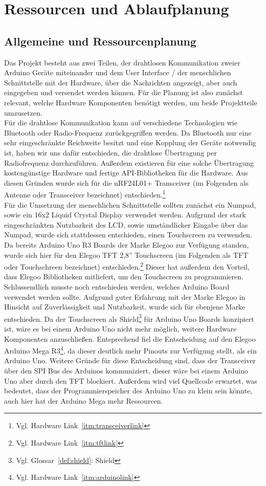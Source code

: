 \documentclass[a4paper, 11pt]{scrartcl}
\begin{document}
\section{Ressourcen und Ablaufplanung}
\subsection{Allgemeine und Ressourcenplanung}\label{ch:planning}
Das Projekt besteht aus zwei Teilen, der drahtlosen Kommunikation zweier Arduino Geräte miteinander und dem User Interface / der menschlichen Schnittstelle mit der
Hardware, über die Nachrichten angezeigt, aber auch eingegeben und versendet werden können. Für die Planung ist also zunächst relevant, welche Hardware Komponenten benötigt werden, 
um beide Projektteile umzusetzen.
\\
Für die drahtlose Kommunikation kann auf verschiedene Technologien wie Bluetooth oder Radio-Frequenz zurückgegriffen werden. Da Bluetooth nur eine sehr eingeschränkte
Reichweite besitzt und eine Kopplung der Geräte notwendig ist, haben wir uns dafür entschieden, die drahtlose Übertragung per Radiofrequenz durchzuführen. Außerdem existieren
für eine solche Übertragung kostengünstige Hardware und fertige API-Bibliotheken für die Hardware. Aus diesen Gründen wurde sich für die nRF24L01+ Transceiver 
(im Folgenden als \glqq Antenne\grqq{} oder \glqq Transceiver\grqq{} bezeichnet) entschieden.\footnote{Vgl. Hardware Link~\ref{itm:transceiverlink}}
\\
Für die Umsetzung der menschlichen Schnittstelle sollten zunächst ein Numpad, sowie ein 16x2 Liquid Crystal Display verwendet werden. Aufgrund der stark eingeschränkten Nutzbarkeit des LCD,
sowie umständlicher Eingabe über das Numpad, wurde sich stattdessen entschieden, einen Touchscreen zu verwenden. Da bereits Arduino Uno R3 Boards der Marke Elegoo zur Verfügung standen,
wurde sich hier für den Elegoo TFT 2,8'' Touchscreen (im Folgenden als \glqq TFT\grqq{} oder \glqq Touchschreen\grqq{} bezeichnet) entschieden.\footnote{Vgl. Hardware Link~\ref{itm:tftlink}} Dieser
hat außerdem den Vorteil, dass Elegoo Bibliotheken mitliefert, um den Touchscreen zu programmieren.
\\
Schlussendlich musste noch entschieden werden, welches Arduino Board verwendet werden sollte. Aufgrund guter Erfahrung mit der Marke Elegoo in Hinsicht auf Zuverlässigkeit und Nutzbarkeit, wurde sich für
ebenjene Marke entschieden. Da der Touchscreen als Shield\footnote{Vgl. Glossar~\ref{def:shield}: Shield} für Arduino Uno Boards konzipiert ist, wäre es bei einem Arduino Uno nicht mehr möglich,
weitere Hardware Komponenten anzuschließen. Entsprechend fiel die Entscheidung auf den Elegoo Arduino Mega R3\footnote{Vgl. Hardware Link~\ref{itm:arduinolink}}, da dieser deutlich mehr Pinouts zur Verfügung
stellt, als ein Arduino Uno. Weitere Gründe für diese Entscheidung sind, dass der Transceiver über den SPI Bus des Arduinos kommuniziert, dieser wäre bei einem Arduino Uno aber durch den TFT blockiert. Außerdem
wird viel Quellcode erwartet, was bedeutet, dass der Programmierspeicher des Arduino Uno zu klein sein könnte, auch hier hat der Arduino Mega mehr Ressourcen.
\end{document}
